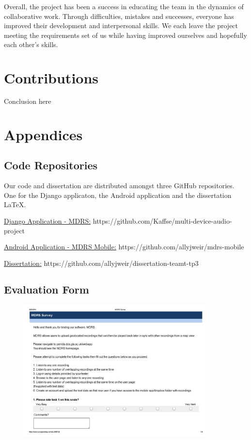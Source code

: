 \documentclass{l3proj}
\begin{document}
Overall, the project has been a success in educating the team in the dynamics of collaborative work. Through difficulties, mistakes and successes, everyone has improved their development and interpersonal skills. We each leave the project meeting the requirements set of us while having improved ourselves and hopefully each other's skills.

\section{Contributions}

Conclusion here

\section{Appendices}
\subsection{Code Repositories}
Our code and dissertation are distributed amongst three GitHub repositories. One for the Django applicaton, the Android application and the dissertation LaTeX.

\href{https://github.com/Kaffse/multi-device-audio-project}{Django Application - MDRS:}
https://github.com/Kaffse/multi-device-audio-project

\href{https://github.com/allyjweir/mdrs-mobile}{Android Application - MDRS Mobile:}
https://github.com/allyjweir/mdrs-mobile

\href{https://github.com/allyjweir/dissertation-teamt-tp3}{Dissertation:}
https://github.com/allyjweir/dissertation-teamt-tp3

\newpage
\subsection{Evaluation Form}

\begin{figure}[ht!]
\centering
\includegraphics[angle=270, width=0.9\textwidth]{images/mdrs_survey-page-001.jpg}
\end{figure}
\end{document}
